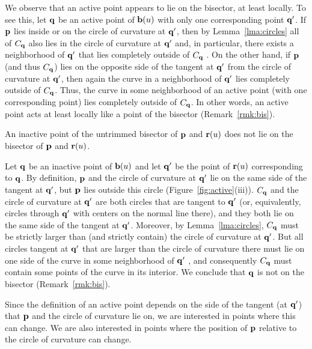\begin{rmk}
\label{r:active}
{\rm
We observe that an active point appears to lie on the bisector, at least
locally. To see this, let ${\bf q}$ be an active point of ${\bf b}(u)$
with only one corresponding point ${\bf q}'$. If ${\bf p}$ lies inside or
on the circle of curvature at ${\bf q}'$, then by Lemma~\ref{lma:circles}
all of $C_{\bf q}$ also lies in the circle of curvature at ${\bf q}'$ and,
in particular, there exists a neighborhood of ${\bf q}'$
that lies completely outside of $C_{\bf q}$ \cite[p.~176]{H52}.
On the other hand, if ${\bf p}$ (and thus $C_{\bf q}$) lies on the opposite side
of the tangent at ${\bf q}'$ from the circle of curvature at ${\bf q}'$,
then again the curve in a neighborhood of ${\bf q}'$ lies completely outside of
$C_{\bf q}$.
Thus, the curve in some neighborhood of an active point (with one corresponding
point) lies completely outside of $C_{\bf q}$.
In other words, an active point acts at least locally
like a point of the bisector (Remark~\ref{rmk:bis}).
}
\end{rmk}

\begin{propn}
An inactive point of the untrimmed bisector of ${\bf p}$ and ${\bf r}(u)$
does not lie on the bisector of ${\bf p}$ and ${\bf r}(u)$.
\end{propn}
\prf
Let ${\bf q}$ be an inactive point of ${\bf b}(u)$ and let ${\bf q}'$
be the point of ${\bf r}(u)$ corresponding to ${\bf q}$. By definition,
${\bf p}$ and the circle of curvature at ${\bf q}'$ lie on the same side
of the tangent at ${\bf q}'$, but ${\bf p}$ lies outside this circle
(Figure~\ref{fig:active}(iii)). $C_{\bf q}$ and the circle of curvature
at ${\bf q}'$ are both circles that are tangent to ${\bf q}'$ (or,
equivalently, circles through ${\bf q}'$ with centers on the normal
line there), and they both lie on the same side of the tangent at
${\bf q}'$. Moreover, by Lemma~\ref{lma:circles}, $C_{\bf q}$ must
be strictly larger than (and strictly contain) the circle of curvature
at ${\bf q}'$. But all circles tangent at ${\bf q}'$ that are larger
than the circle of curvature there must lie on one side of the curve
in some neighborhood of ${\bf q}'$ \cite[p.~176]{H52}, and consequently
$C_{\bf q}$ must contain some points of the curve in its interior. We
conclude that ${\bf q}$ is not on the bisector (Remark~\ref{rmk:bis}).
\QED

Since the definition of an active point depends on the side of the
tangent (at ${\bf q}'$) that ${\bf p}$ and the circle of curvature lie
on, we are interested in points where this can change.
We are also interested in points where the position of ${\bf p}$
relative to the circle of curvature can change.


